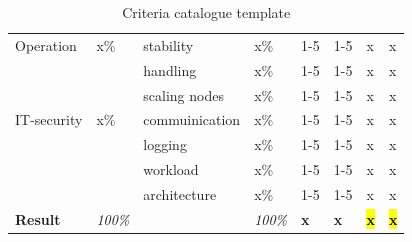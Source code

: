 \documentclass[MIC,Master,english]{twbook}%
\begin{document}
\begin{table}[ht]
\begin{center}
{\begin{tabular}{|l|l|l|l|l|l|l|l|}
            \hline
            Operation & x\% & stability & x\% & 1-5 & 1-5 & x & x \\
            & & handling & x\% & 1-5 & 1-5 & x & x \\
            & & scaling nodes & x\% & 1-5 & 1-5 & x & x \\
            \hline
            IT-security & x\% & commuinication & x\% & 1-5 & 1-5 & x & x \\
            & & logging & x\% & 1-5 & 1-5 & x & x \\
            & & workload & x\% & 1-5 & 1-5 & x & x \\
            & & architecture & x\% & 1-5 & 1-5 & x & x \\
            \hline \hline
            \textbf{Result} & \textit{100\%} & & \textit{100\%} & \textbf{x} & \textbf{x} & \hl{\textbf{x}} & \hl{\textbf{x}} \\
            \hline
        \end{tabular}}
        \caption{Criteria catalogue template}
        \label{tab:cctt}
    \end{center}
\end{table}
\end{document}

